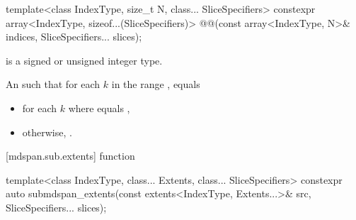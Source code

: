 %
\begin{itemdecl}
template<class IndexType, size_t N, class... SliceSpecifiers>
  constexpr array<IndexType, sizeof...(SliceSpecifiers)>
    @@(const array<IndexType, N>& indices, SliceSpecifiers... slices);
\end{itemdecl}

\begin{itemdescr}
\pnum
\mandates
{} is a signed or unsigned integer type.

\pnum
\returns
An  such that
for each $k$ in the range ,
 equals

\begin{itemize}
\item
 for each $k$
where  equals
,

\item
otherwise,
 \tcode{+}
.
\end{itemize}
\end{itemdescr}

[mdspan.sub.extents]{ function}

%
\begin{itemdecl}
template<class IndexType, class... Extents, class... SliceSpecifiers>
  constexpr auto submdspan_extents(const extents<IndexType, Extents...>& src,
                                   SliceSpecifiers... slices);
\end{itemdecl}

